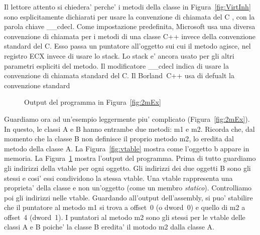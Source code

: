 Il lettore attento si chiedera' perche' i metodi della classe in 
Figura~\ref{fig:VirtInh} sono esplicitamente dichiarati per usare la
convenzione di chiamata del C , con la parola chiave {\code \_\_cdecl}.
Come impostazione predefinita, Microsoft usa una diversa convenzione
di chiamata per i metodi di una classe C++ invece della convenzione
standard del C. Esso passa un puntatore all'oggetto sui cui il metodo
agisce, nel registro {\code ECX} invece di usare lo stack. Lo stack e'
ancora usato per gli altri parametri espliciti del metodo. Il modificatore
{\code \_\_cdecl} indica di usare la convenzione di chiamata standard del C.
Il Borland~C++ usa di defualt la convenzione standard

\begin{figure}[tp]
\caption{Output del programma in Figura~\ref{fig:2mEx} \label{fig:2mExOut}}
\end{figure}

Guardiamo ora ad un'esempio leggermente piu' complicato
(Figura~\ref{fig:2mEx}). In questo, le classi {\code A} e {\code B}
hanno entrambe due metodi: {\code m1} e {\code m2}. Ricorda che,
dal momento che la classe {\code B} non definisce il proprio
metodo {\code m2}, lo eredita dal metodo della classe {\code A}.
La Figura~\ref{fig:vtable} mostra come l'oggetto {\code b} appare
in memoria. La Figura~\ref{fig:2mExOut} mostra l'output del programma.
Prima di tutto guardiamo gli indirizzi della vtable per ogni oggetto.
Gli indirizzi dei due oggetti {\code B} sono gli stessi e cosi' essi
condividono la stessa vtable. Una vtable rappresenta una proprieta'
della classe e non un'oggetto (come un membro \emph{statico}). 
Controlliamo poi gli indirizzi nelle vtable. Guardando all'output
dell'assembly, si puo' stabilire che il puntatore al metodo {\code m1}
si trova a offset~0 (o dword~0) e quello di {\code m2} a offset~4
(dword~1). I puntatori al metodo {\code m2} sono gli stessi per le
vtable delle classi {\code A} e {\code B} poiche' la classe {\code B}
eredita' il motodo {\code m2} dalla classe {\code A}. 

